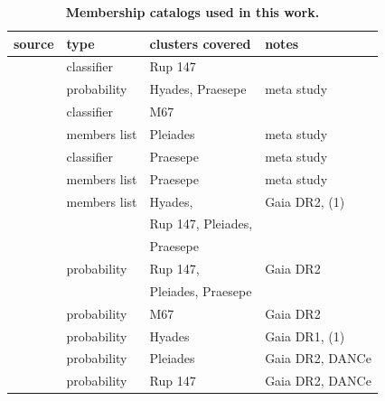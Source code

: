 \documentclass{aa}
\begin{document}
\begin{appendix}

\begin{table}
\caption{\textbf{Membership catalogs used in this work.}}
\label{tab:app:memberships}
\centering
\begin{tabular}{llll}     %
\hline\hline
     source  & type  & clusters covered & notes\\
\hline
   \citet{curtis_ruprecht_2013} & classifier & Rup 147 & \\
   \citet{douglas_praesepe_hyades_2014} & probability & Hyades, Praesepe & meta study \\
   \citet{gonzalez_m67mem_2016} & classifier & M67 & \\
   \citet{rebull_pleiadesrot_2016} & members list & Pleiades & meta study\\
   \citet{rebull_praesepe_2017} & classifier & Praesepe & meta study\\
   \citet{douglas_poking_2017} & members list & Praesepe & meta study\\
   \citet{gaia_dr2_2018_hrd} & members list & Hyades,   & Gaia DR2, (1)\\%
   &&Rup 147, Pleiades, &\\
   &&Praesepe&\\
   \citet{cantat_gaudin_2018} & probability & Rup 147, & Gaia DR2\\%
   && Pleiades, Praesepe&\\
   \citet{gao_m67mem_2018} & probability & M67 & Gaia DR2\\
   \citet{reino_hyades_2018} & probability & Hyades & Gaia DR1, (1)\\
   \citet{olivares_pleiades_2018} & probability & Pleiades & Gaia DR2, DANCe\\
   \citet{olivares_ngc6774_2019} & probability & Rup 147 & Gaia DR2, DANCe\\
\hline
\end{tabular}
\end{table}


\end{appendix}
\end{document}
